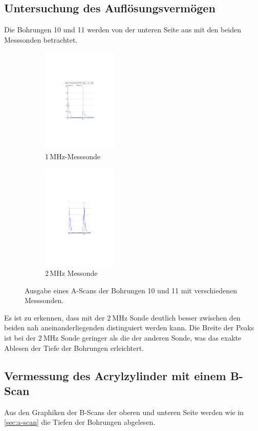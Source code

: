 \subsection{Untersuchung des Auflösungsvermögen}
Die Bohrungen 10 und 11 werden von der unteren Seite aus mit den beiden Messsonden betrachtet.
\begin{figure}
    \begin{subfigure}{0.48\textwidth}
      \centering
      \includegraphics[height=5cm]{content/pics/1MHz.pdf}
      \caption{1\,MHz-Messsonde}
      \label{fig:1MHz}
    \end{subfigure}
    \hfill
    \begin{subfigure}{0.48\textwidth}
      \centering
      \includegraphics[height=5cm]{content/pics/2MHz.pdf}
      \caption{2\,MHz Messonde}
      \label{fig:2MHz}
    \end{subfigure}
    \caption{Ausgabe eines A-Scans der Bohrungen 10 und 11 mit verschiedenen Messsonden.}
    \label{fig:Auflösung}
  \end{figure}
Es ist zu erkennen, dass mit der $\qty{2}{\mega\hertz}$ Sonde deutlich besser zwischen den beiden nah aneinanderliegenden distinguiert 
werden kann. Die Breite der Peaks ist bei der $\qty{2}{\mega\hertz}$ Sonde geringer als die der anderen Sonde, was das exakte Ablesen der
Tiefe der Bohrungen erleichtert.

\subsection{Vermessung des Acrylzylinder mit einem B-Scan}
Aus den Graphiken der B-Scans der oberen und unteren Seite werden wie in \ref{sec:a-scan} die Tiefen der Bohrungen abgelesen.

